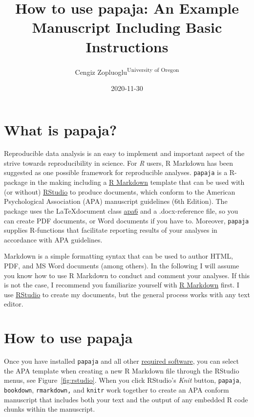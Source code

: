\documentclass[
  english,
  man]{apa6}
\title{How to use papaja: An Example Manuscript Including Basic Instructions}
\author{Cengiz Zopluoglu\textsuperscript{University of Oregon}}
\date{2020-11-30}
\affiliation{\phantom{0}}
\begin{document}
\maketitle

\hypertarget{what-is-papaja}{%
\section{What is papaja?}\label{what-is-papaja}}

Reproducible data analysis is an easy to implement and important aspect of the strive towards reproducibility in science.
For \emph{R} users, R Markdown has been suggested as one possible framework for reproducible analyses.
\texttt{papaja} is a R-package in the making including a \href{http://rmarkdown.rstudio.com/}{R Markdown} template that can be used with (or without) \href{http://www.rstudio.com/}{RStudio} to produce documents, which conform to the American Psychological Association (APA) manuscript guidelines (6th Edition).
The package uses the \LaTeX document class \href{http://www.ctan.org/pkg/apa6}{apa6} and a .docx-reference file, so you can create PDF documents, or Word documents if you have to.
Moreover, \texttt{papaja} supplies R-functions that facilitate reporting results of your analyses in accordance with APA guidelines.

Markdown is a simple formatting syntax that can be used to author HTML, PDF, and MS Word documents (among others).
In the following I will assume you know how to use R Markdown to conduct and comment your analyses.
If this is not the case, I recommend you familiarize yourself with \href{http://rmarkdown.rstudio.com/}{R Markdown} first.
I use \href{http://www.rstudio.com/}{RStudio} to create my documents, but the general process works with any text editor.

\hypertarget{how-to-use-papaja}{%
\section{How to use papaja}\label{how-to-use-papaja}}

Once you have installed \texttt{papaja} and all other \href{https://github.com/crsh/papaja\#requirements}{required software}, you can select the APA template when creating a new R Markdown file through the RStudio menus, see Figure~\ref{fig:rstudio}.
When you click RStudio's \emph{Knit} button, \texttt{papaja}, \texttt{bookdown}, \texttt{rmarkdown,} and \texttt{knitr} work together to create an APA conform manuscript that includes both your text and the output of any embedded R code chunks within the manuscript.
\end{document}
